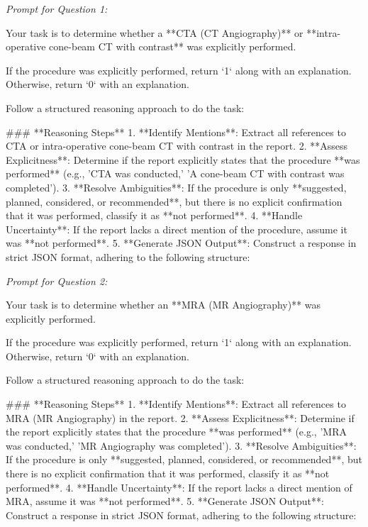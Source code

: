 \textit{\normalsize Prompt for Question  1:}
\begin{mdframed}[]
\normalsize
Your task is to determine whether a **CTA (CT Angiography)** or **intra-operative cone-beam CT with contrast** was explicitly performed.  

If the procedure was explicitly performed, return `1` along with an explanation. Otherwise, return `0` with an explanation.

Follow a structured reasoning approach to do the task:

### **Reasoning Steps**  
1. **Identify Mentions**: Extract all references to CTA or intra-operative cone-beam CT with contrast in the report.  
2. **Assess Explicitness**: Determine if the report explicitly states that the procedure **was performed** (e.g., 'CTA was conducted,' 'A cone-beam CT with contrast was completed').  
3. **Resolve Ambiguities**: If the procedure is only **suggested, planned, considered, or recommended**, but there is no explicit confirmation that it was performed, classify it as **not performed**.  
4. **Handle Uncertainty**: If the report lacks a direct mention of the procedure, assume it was **not performed**.  
5. **Generate JSON Output**: Construct a response in strict JSON format, adhering to the following structure:  
\end{mdframed}

\textit{\normalsize Prompt for Question  2:}
\begin{mdframed}[]
\normalsize

Your task is to determine whether an **MRA (MR Angiography)** was explicitly performed. 

If the procedure was explicitly performed, return `1` along with an explanation. Otherwise, return `0` with an explanation.

Follow a structured reasoning approach to do the task:

### **Reasoning Steps**  
1. **Identify Mentions**: Extract all references to MRA (MR Angiography) in the report.  
2. **Assess Explicitness**: Determine if the report explicitly states that the procedure **was performed** (e.g., 'MRA was conducted,' 'MR Angiography was completed').  
3. **Resolve Ambiguities**: If the procedure is only **suggested, planned, considered, or recommended**, but there is no explicit confirmation that it was performed, classify it as **not performed**.  
4. **Handle Uncertainty**: If the report lacks a direct mention of MRA, assume it was **not performed**.  
5. **Generate JSON Output**: Construct a response in strict JSON format, adhering to the following structure:  
\end{mdframed}

